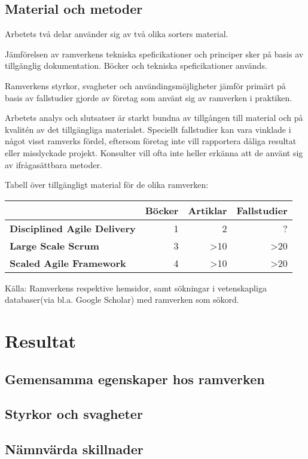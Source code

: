 \subsection{Material och metoder}
Arbetets två delar använder sig av två olika sorters material.

Jämförelsen av ramverkens tekniska speficikationer och principer sker på basis av tillgänglig dokumentation. Böcker och tekniska speficikationer används.
\linebreak

Ramverkens styrkor, svagheter och användingsmöjligheter jämför primärt på basis av fallstudier gjorde av företag som använt sig av ramverken i praktiken.



Arbetets analys och slutsatser är starkt bundna av tillgången till material och på kvalitén av det tillgängliga materialet. Speciellt fallstudier kan vara vinklade i något visst ramverks fördel, eftersom företag inte vill rapportera dåliga resultat eller misslyckade projekt. Konsulter vill ofta inte heller erkänna att de använt sig av ifrågasättbara metoder.


Tabell över tillgängligt material för de olika ramverken:
\begin{center}

\begin{tabular}{ >{\bfseries}l | r | r | r }
	  & Böcker & Artiklar & Fallstudier \\ \hline
	Disciplined Agile Delivery & 1 & 2 & ? \\ \hline
	Large Scale Scrum & 3 & >10 & >20 \\ \hline
	Scaled Agile Framework & 4 & >10 & >20 \\ 
\end{tabular}
\end{center}
Källa: Ramverkens respektive hemsidor\cite{dad_web, less_web, safe_web}, samt sökningar i vetenskapliga databaser(via bl.a. Google Scholar) med ramverken som sökord.



\newpage

\section{Resultat}

\subsection{Gemensamma egenskaper hos ramverken}

\subsection{Styrkor och svagheter}

\subsection{Nämnvärda skillnader}
